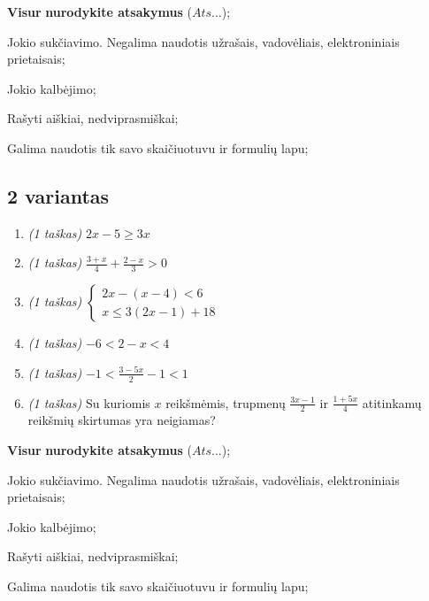 \documentclass[a4paper]{article}
\begin{document}
\begin{small}
      \begin{enumerate*}[label={(\arabic*)}]
            \item \textbf{Visur} \textbf{nurodykite atsakymus} ($Ats\ldots$);
            \item Jokio sukčiavimo. Negalima naudotis užrašais, vadovėliais,
            elektroniniais prietaisais;
            \item Jokio kalbėjimo;
            \item Rašyti aiškiai, nedviprasmiškai;
            \item Galima naudotis tik savo skaičiuotuvu ir formulių lapu;
      \end{enumerate*}
\end{small}

\vspace*{3mm}

\subsection*{2 variantas}

\begin{enumerate}
      \item \textit{(1 taškas)} $2x-5 \geqslant 3x$
      \item \textit{(1 taškas)} $\frac{3+x}{4}+\frac{2-x}{3}>0$
      \item \textit{(1 taškas)}
      \(
      \left\{\begin{matrix}
            2x-(x-4) < 6 \\
            x \leqslant 3(2x-1)+18
      \end{matrix}\right.
      \)
      \item \textit{(1 taškas)} $-6<2-x<4 $
      \item \textit{(1 taškas)} $-1<\frac{3-5x}{2}-1 < 1$
      \item \textit{(1 taškas)} Su kuriomis $x$ reikšmėmis, trupmenų $\frac{3x-1}{2}$ ir $\frac{1+5x}{4}$ atitinkamų reikšmių skirtumas yra neigiamas?
\end{enumerate}

\begin{small}
      \begin{enumerate*}[label={(\arabic*)}]
            \item \textbf{Visur} \textbf{nurodykite atsakymus} ($Ats\ldots$);
            \item Jokio sukčiavimo. Negalima naudotis užrašais, vadovėliais,
            elektroniniais prietaisais;
            \item Jokio kalbėjimo;
            \item Rašyti aiškiai, nedviprasmiškai;
            \item Galima naudotis tik savo skaičiuotuvu ir formulių lapu;
      \end{enumerate*}
\end{small}
\end{document}
